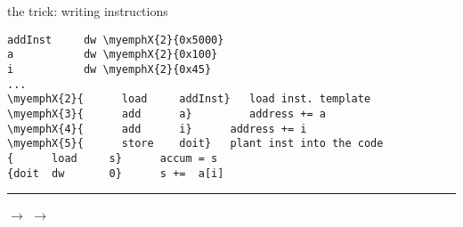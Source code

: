 \begin{frame}[fragile,label=theTrick]{the trick: writing instructions}
\providecommand{\myemphX}[2]{\myemph<#1>{#2}}
\begin{Verbatim}[commandchars=\\\{\}]
addInst     dw \myemphX{2}{0x5000}
a           dw \myemphX{2}{0x100}
i           dw \myemphX{2}{0x45}
...
\myemphX{2}{      load     addInst}   load inst. template
\myemphX{3}{      add      a}         address += a
\myemphX{4}{      add      i}      address += i
\myemphX{5}{      store    doit}   plant inst into the code
{      load     s}      accum = s
{doit  dw       0}      s +=  a[i]
\end{Verbatim}
\hrule
\vspace{1cm}
\small
{} $\rightarrow$  $\rightarrow$ 
\end{frame}

\providecommand{\connectBoxes}[3]{
\path[#1] (#2.south east) -- (#3.south west);
\path[#1] (#2.north east) -- (#3.north west);
}

